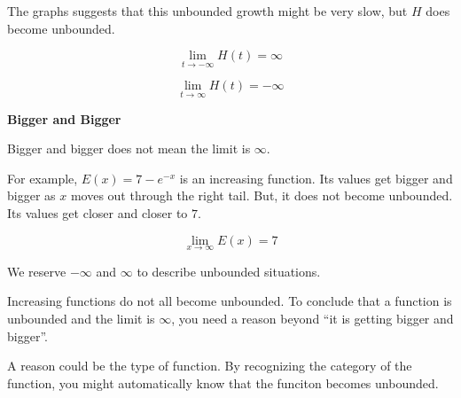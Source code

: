 \documentclass{ximera}
\begin{document}
The graphs suggests that this unbounded growth might be very slow, but $H$ does become unbounded.





\[
\lim\limits_{t \to -\infty} H(t) = \infty
\]



\[
\lim\limits_{t \to \infty} H(t) = -\infty
\]




\begin{warning} \textbf{\textcolor{red!70!black}{Bigger and Bigger}} 


Bigger and bigger does not mean the limit is $\infty$.


For example,  $E(x) = 7 - e^{-x}$ is an increasing function.  Its values get bigger and bigger as $x$ moves out through the right tail. But, it does not become unbounded. Its values get closer and closer to $7$.





\[
\lim\limits_{x \to \infty} E(x) = 7
\]



We reserve $-\infty$ and $\infty$ to describe unbounded situations.

\end{warning}








Increasing functions do not all become unbounded.  To conclude that a function is unbounded and the limit is $\infty$, you need a reason beyond ``it is getting bigger and bigger''.

A reason could be the type of function.  By recognizing the category of the function, you might automatically know that the funciton becomes unbounded.
\end{document}
